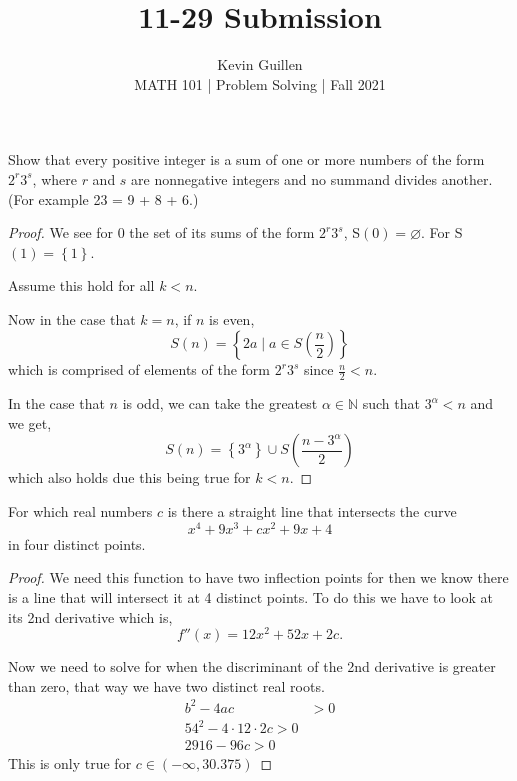 \documentclass[11pt]{article}
\newenvironment{problem}[2][Problem\!]{\begin{trivlist}
\item[\hskip \labelsep {\bfseries #1}\hskip \labelsep {\bfseries #2}]}{\end{trivlist}}
\newcommand{\nn}{\mathbb N}   %
\newcommand{\set}[1]{\left\{#1\right\}} %
\renewcommand{\emptyset}{\varnothing}
\begin{document}
 
\title{11-29 Submission}
\author{Kevin Guillen\\[0.5em]
MATH 101 | Problem Solving | Fall 2021}
\date{} 
\maketitle


\begin{tcolorbox}
  \begin{problem} {IC | 11-22 | PP2}
    Show that every positive integer is a sum of one or more numbers of the form $2^{r}3^{s}$, where $r$ and $s$ are nonnegative integers and no summand divides another. (For example 23 = 9 + 8 + 6.)
  \end{problem}
\end{tcolorbox}
\begin{proof}
    We see for 0 the set of its sums of the form $2^{r}3^{s}$, S$(0) = \emptyset$. For S$(1) = \set{1}$. 

    Assume this hold for all $k < n$.

    Now in the case that $k = n$, if $n$ is even, \[S(n) = \set{2a \mid a \in S(\frac{n}{2})}\] which is comprised of elements of the form $2^{r}3^{s}$ since $\frac{n}{2} < n$.

    In the case that $n$ is odd, we can take the greatest $\alpha\in \nn$ such that $3^{\alpha} < n$ and we get, \[S(n) = \set{3^{\alpha}}\cup S(\dfrac{n - 3^{\alpha}}{2})\]
    which also holds due this being true for $k < n$. 
\end{proof}

\begin{tcolorbox}
    \begin{problem} {IC | 11-22 | PP14}
        For which real numbers $c$ is there a straight line that intersects the curve \[x^{4} + 9x^{3} + cx^{2} + 9x + 4\]
        in four distinct points. 
    \end{problem}
\end{tcolorbox}
\begin{proof}
    We need this function to have two inflection points for then we know there is a line that will intersect it at 4 distinct points. To do this we have to look at its 2nd derivative which is,
    \[f''(x) = 12x^{2} + 52x + 2c.\]

    Now we need to solve for when the discriminant of the 2nd derivative is greater than zero, that way we have two distinct real roots. 
    \begin{align*}
        b^{2} - 4ac &> 0 \\
        54^{2} - 4\cdot12 \cdot 2c  > 0 \\
        2916 - 96c > 0 
    \end{align*}
    This is only true for $c \in (-\infty,30.375)$

\end{proof}
\end{document}
